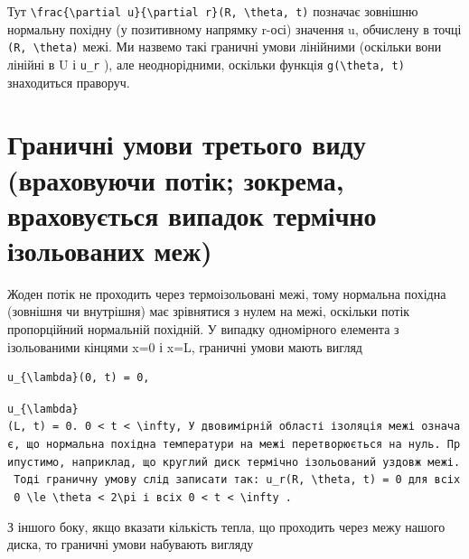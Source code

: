\documentclass[
  ukrainian,
]{article}
\begin{document}
Тут
\texttt{\textbackslash{}frac\{\textbackslash{}partial\ u\}\{\textbackslash{}partial\ r\}(R,\ \textbackslash{}theta,\ t)}
позначає зовнішню нормальну похідну (у позитивному напрямку r-осі)
значення u, обчислену в точці \texttt{(R,\ \textbackslash{}theta)} межі.
Ми назвемо такі граничні умови лінійними (оскільки вони лінійні в U і
\texttt{u\_r} ), але неоднорідними, оскільки функція
\texttt{g(\textbackslash{}theta,\ t)} знаходиться праворуч.

\section{Граничні умови третього виду (враховуючи потік; зокрема,
враховується випадок термічно ізольованих
меж)}\label{ux433ux440ux430ux43dux438ux447ux43dux456-ux443ux43cux43eux432ux438-ux442ux440ux435ux442ux44cux43eux433ux43e-ux432ux438ux434ux443-ux432ux440ux430ux445ux43eux432ux443ux44eux447ux438-ux43fux43eux442ux456ux43a-ux437ux43eux43aux440ux435ux43cux430-ux432ux440ux430ux445ux43eux432ux443ux454ux442ux44cux441ux44f-ux432ux438ux43fux430ux434ux43eux43a-ux442ux435ux440ux43cux456ux447ux43dux43e-ux456ux437ux43eux43bux44cux43eux432ux430ux43dux438ux445-ux43cux435ux436}

Жоден потік не проходить через термоізольовані межі, тому нормальна
похідна (зовнішня чи внутрішня) має зрівнятися з нулем на межі, оскільки
потік пропорційний нормальній похідній. У випадку одномірного елемента з
ізольованими кінцями x=0 і x=L, граничні умови мають вигляд

\begin{verbatim}
u_{\lambda}(0, t) = 0,
\end{verbatim}

\texttt{\textquotesingle{}u\_\{\textbackslash{}lambda\}(L,\ t)\ =\ 0.\textquotesingle{}\ \textquotesingle{}0\ \textless{}\ t\ \textless{}\ \textbackslash{}infty,\textquotesingle{}\ У\ двовимірній\ області\ ізоляція\ межі\ означає,\ що\ нормальна\ похідна\ температури\ на\ межі\ перетворюється\ на\ нуль.\ Припустимо,\ наприклад,\ що\ круглий\ диск\ термічно\ ізольований\ уздовж\ межі.\ Тоді\ граничну\ умову\ слід\ записати\ так:\ \textquotesingle{}u\_r(R,\ \textbackslash{}theta,\ t)\ =\ 0\textquotesingle{}\ для\ всіх\ \textquotesingle{}0\ \textbackslash{}le\ \textbackslash{}theta\ \textless{}\ 2\textbackslash{}pi\textquotesingle{}\ і\ всіх\ \textquotesingle{}0\ \textless{}\ t\ \textless{}\ \textbackslash{}infty\textquotesingle{}\ .}

З іншого боку, якщо вказати кількість тепла, що проходить через межу
нашого диска, то граничні умови набувають вигляду
\end{document}
